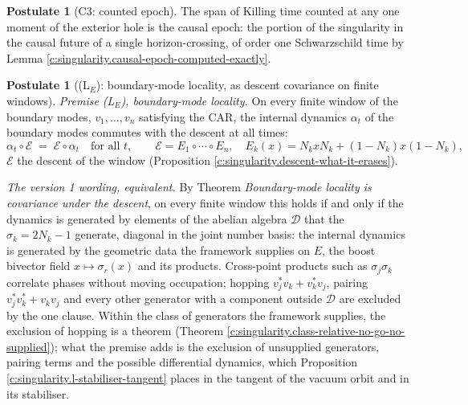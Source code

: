 \documentclass[11pt]{article}
\theoremstyle{definition}
\newtheorem{postulate}[theorem]{Postulate}
\theoremstyle{plain}
\newcommand{\changedmark}[2]{\marginpar{\raggedright\scriptsize\color{#1}#2}}
\begin{document}
\begin{postulate}[C3: counted epoch]\label{c:singularity.c3-counted-epoch}
The span of Killing time counted at any one moment of the exterior hole is the causal epoch: the portion of the singularity in the causal future of a single horizon-crossing, of order one Schwarzschild time by Lemma \ref{c:singularity.causal-epoch-computed-exactly}.
\end{postulate}

\begin{postulate}[(L$_E$): boundary-mode locality, as descent covariance on finite windows]\label{c:singularity.l-boundary-mode-locality}
\changedmark{BurntOrange}{changed since the deposit}
\emph{Premise (L$_{E}$), boundary-mode locality.} On every finite window of the boundary modes, $v_{1}, \dots, v_{n}$ satisfying the CAR, the internal dynamics $\alpha_{t}$ of the boundary modes commutes with the descent at all times:
\[
\alpha_{t}\circ\mathcal{E} \;=\; \mathcal{E}\circ\alpha_{t} \quad \text{for all } t, \qquad \mathcal{E} = E_{1}\circ\cdots\circ E_{n}, \quad E_{k}(x) = N_{k}xN_{k} + (1 - N_{k})x(1 - N_{k}),
\]
$\mathcal{E}$ the descent of the window (Proposition \ref{c:singularity.descent-what-it-erases}).

\emph{The version 1 wording, equivalent.} By Theorem \emph{Boundary-mode locality is covariance under the descent}, on every finite window this holds if and only if the dynamics is generated by elements of the abelian algebra $\mathcal{D}$ that the $\sigma_{k} = 2N_{k} - 1$ generate, diagonal in the joint number basis: the internal dynamics is generated by the geometric data the framework supplies on $E$, the boost bivector field $x \mapsto \sigma_{r}(x)$ and its products. Cross-point products such as $\sigma_{j}\sigma_{k}$ correlate phases without moving occupation; hopping $v_{j}^{*}v_{k} + v_{k}^{*}v_{j}$, pairing $v_{j}^{*}v_{k}^{*} + v_{k}v_{j}$ and every other generator with a component outside $\mathcal{D}$ are excluded by the one clause. Within the class of generators the framework supplies, the exclusion of hopping is a theorem (Theorem \ref{c:singularity.class-relative-no-go-no-supplied}); what the premise adds is the exclusion of unsupplied generators, pairing terms and the possible differential dynamics, which Proposition \ref{c:singularity.l-stabiliser-tangent} places in the tangent of the vacuum orbit and in its stabiliser.


\end{postulate}
\end{document}
